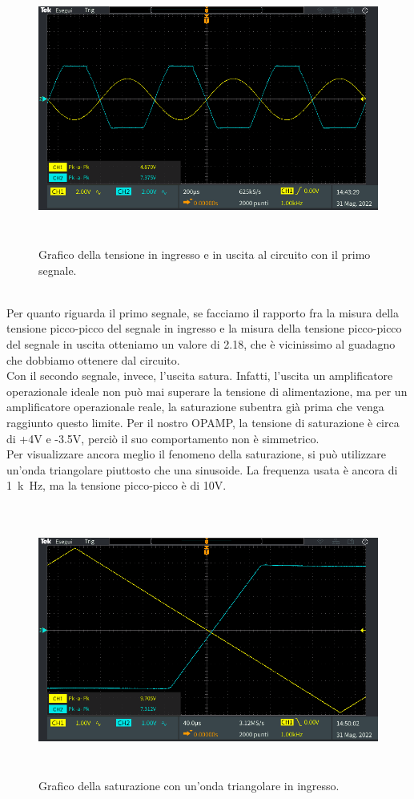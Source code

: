 \documentclass{report}
\begin{document}
\begin{figure}[h]
\centering
\includegraphics[height=8.9cm]{immagini/oscillo13}
\caption{Grafico della tensione in ingresso e in uscita al circuito con il primo segnale.}
\label{figura:oscillo13}
\end{figure}
\\Per quanto riguarda il primo segnale, se facciamo il rapporto fra la misura della tensione picco-picco del segnale in ingresso e la misura della tensione picco-picco del segnale in uscita otteniamo un valore di 2.18, che è vicinissimo al guadagno che dobbiamo ottenere dal circuito.
\\\indent Con il secondo segnale, invece, l'uscita satura. Infatti, l'uscita un amplificatore operazionale ideale non può mai superare la tensione di alimentazione, ma per un amplificatore operazionale reale, la saturazione subentra già prima che venga raggiunto questo limite. Per il nostro OPAMP, la tensione di saturazione è circa di +4V e -3.5V, perciò il suo comportamento non è simmetrico.
\\Per visualizzare ancora meglio il fenomeno della saturazione, si può utilizzare un'onda triangolare piuttosto che una sinusoide. La frequenza usata è ancora di \SI{1}{k\hertz}, ma la tensione picco-picco è di 10V.
\begin{figure}[h!]
\centering
\includegraphics[height=8.9cm]{immagini/oscillo14}
\caption{Grafico della saturazione con un'onda triangolare in ingresso.}
\label{figura:oscillo14}
\end{figure}
\end{document}
